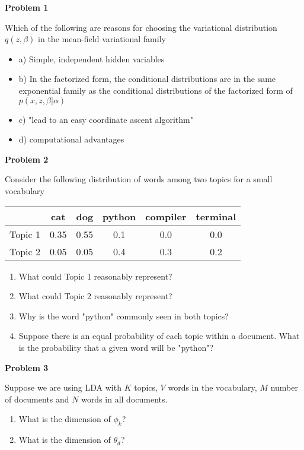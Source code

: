 \documentclass[a4paper]{article}
\begin{document}


\pagestyle{fancy}
\fancyhead{} %
\fancyfoot{}
\fancyfoot[C]{\thepage}
\setlength{\parindent}{0pt}
\def\BState{\State\hskip-\ALG@thistlm}
\def\bm{\begin{bmatrix}}
\def\em{\end{bmatrix}}


{\bf Problem 1}

Which of the following are reasons for choosing the variational distribution $q(z,\beta)$ in the mean-field variational family
\begin{itemize}
    \item a) Simple, independent hidden variables
    \item b) In the factorized form, the conditional distributions are in the same exponential family as the conditional distributions of the factorized form of $p(x,z,\beta|\alpha)$
    \item c) "lead to an easy coordinate ascent algorithm"
    \item d) computational advantages
\end{itemize}

\bigskip

{\bf Problem 2}

Consider the following distribution of words among two topics for a small vocabulary

\medskip

\begin{tabular}{|c|c|c|c|c|c|}
    \hline
            & cat & dog & python & compiler & terminal\\
    \hline
    Topic 1 & 0.35 & 0.55 & 0.1 & 0.0 & 0.0 \\
    \hline
    Topic 2 & 0.05 & 0.05 & 0.4 & 0.3 & 0.2 \\
    \hline
\end{tabular}

\medskip

\begin{enumerate}
\item What could Topic 1 reasonably represent?
\item What could Topic 2 reasonably represent?
\item Why is the word "python" commonly seen in both topics?
\item Suppose there is an equal probability of each topic within a document.  What is the probability that a given word will be "python"?
\end{enumerate}

\medskip

{\bf Problem 3}

Suppose we are using LDA with $K$ topics, $V$ words in the vocabulary, $M$ number of documents and $N$ words in all documents.

\begin{enumerate}
    \item What is the dimension of $\phi_k$?
    \item What is the dimension of $\theta_d$?
    
\end{enumerate}
\end{document}
